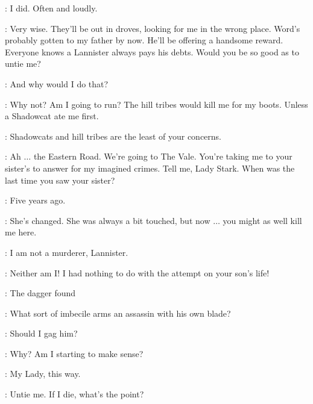 \CATELYN: I did.  Often and loudly. 

\TYRION: Very wise. They'll be out in droves, looking for me in the wrong place. Word's probably gotten to my father by now. He'll be offering a handsome reward. Everyone knows a Lannister always pays his debts. Would you be so good as to untie me? 

\CATELYN: And why would I do that? 

\TYRION: Why not? Am I going to run? The hill tribes would kill me for my boots. Unless a Shadowcat ate me first. 

\CATELYN: Shadowcats and hill tribes are the least of your concerns. 

\TYRION: Ah $\ldots$ the Eastern Road. We're going to The Vale. You're taking me to your sister's to answer for my imagined crimes. Tell me, Lady Stark. When was the last time you saw your sister? 

\CATELYN: Five years ago. 

\TYRION: She's changed. She was always a bit touched, but now $\ldots$ you might as well kill me here. 

\CATELYN: I am not a murderer, Lannister. 

\TYRION: Neither am I! I had nothing to do with the attempt on your son's life! 

\CATELYN: The dagger found 

\TYRION: What sort of imbecile arms an assassin with his own blade? 

\RODRIK: Should I gag him? 

\TYRION: Why? Am I starting to make sense? 


\RODRIK: My Lady, this way. 


\TYRION: Untie me. If I die, what's the point? 


